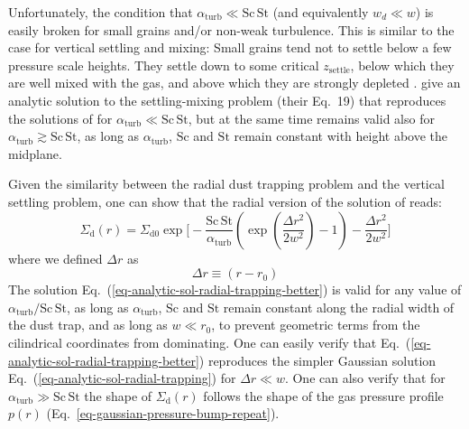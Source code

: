 \documentclass{aa}
\begin{document}
Unfortunately, the condition that $\alpha_{\mathrm{turb}}\ll
\mathrm{Sc}\,\mathrm{St}$ (and equivalently $w_d\ll w$) is easily broken for
small grains and/or non-weak turbulence. This is similar to the case for
vertical settling and mixing: Small grains tend not to settle below a few
pressure scale heights. They settle down to some critical $z_{\mathrm{settle}}$,
below which they are well mixed with the gas, and above which they are strongly
depleted \citep{2004A&A...421.1075D}. \citet{2009A&A...496..597F} give an
analytic solution to the settling-mixing problem (their Eq.~19) that reproduces
the solutions of \citet{1995Icar..114..237D} for $\alpha_{\mathrm{turb}}\ll
\mathrm{Sc}\,\mathrm{St}$, but at the same time remains valid also for
$\alpha_{\mathrm{turb}}\gtrsim \mathrm{Sc}\,\mathrm{St}$, as long as
$\alpha_{\mathrm{turb}}$, $\mathrm{Sc}$ and $\mathrm{St}$ remain constant with
height above the midplane.

Given the similarity between the radial dust trapping problem and the vertical
settling problem, one can show that the radial version of the solution of
\citet{2009A&A...496..597F} reads:
\begin{equation}\label{eq-analytic-sol-radial-trapping-better}
  \Sigma_{\mathrm{d}}(r) = \Sigma_{\mathrm{d0}} \exp\Bigg[
    -\frac{\mathrm{Sc}\,\mathrm{St}}{\alpha_{\mathrm{turb}}}
     \left(\exp\left(\frac{\Delta r^2}{2w^2}\right)-1\right)
    -\frac{\Delta r^2}{2w^2}\Bigg]
\end{equation}
where we defined $\Delta r$ as
\begin{equation}
\Delta r \equiv (r-r_0)
\end{equation}
The solution Eq.~(\ref{eq-analytic-sol-radial-trapping-better}) is valid for
any value of $\alpha_{\mathrm{turb}}/\mathrm{Sc}\,\mathrm{St}$, as long as
$\alpha_{\mathrm{turb}}$, $\mathrm{Sc}$ and $\mathrm{St}$ remain constant along
the radial width of the dust trap, and as long as $w\ll r_0$, to prevent
geometric terms from the cilindrical coordinates from dominating.  One can
easily verify that Eq.~(\ref{eq-analytic-sol-radial-trapping-better}) reproduces
the simpler Gaussian solution Eq.~(\ref{eq-analytic-sol-radial-trapping}) for
$\Delta r\ll w$. One can also verify that for $\alpha_{\mathrm{turb}}\gg
\mathrm{Sc}\,\mathrm{St}$ the shape of $\Sigma_{\mathrm{d}}(r)$ follows the
shape of the gas pressure profile $p(r)$ (Eq.~\ref{eq-gaussian-pressure-bump-repeat}).
\end{document}

